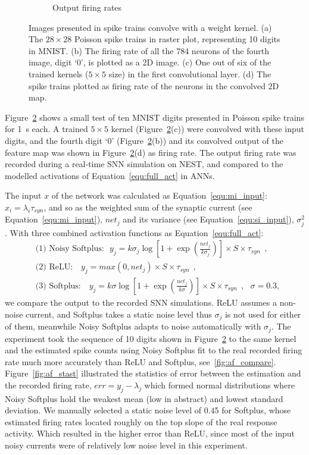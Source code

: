 \begin{figure}[tbh!]
\begin{subfigure}[t]{0.3\textwidth}
			\caption{Output firing rates}
			\label{Fig:64}
		\end{subfigure}
		\caption{Images presented in spike trains convolve with a weight kernel. (a) The $28\times28$ Poisson spike trains in raster plot, representing 10 digits in MNIST. (b) The firing rate of all the 784 neurons of the fourth image, digit `0', is plotted as a 2D image.
		(c) One out of six of the trained kernels ($5\times5$ size) in the first convolutional layer.
		(d) The spike trains plotted as firing rate of the neurons in the convolved 2D map.}
		\label{fig:cnn}
	\end{figure}

	Figure~\ref{fig:cnn} shows a small test of ten MNIST digits presented in Poisson spike trains for 1~s each.
	A trained $5\times5$ kernel (Figure~\ref{fig:cnn}(c)) were convolved with these input digits, and the fourth digit `0' (Figure~\ref{fig:cnn}(b)) and its convolved output of the feature map was shown in Figure~\ref{fig:cnn}(d) as firing rate.
	The output firing rate was recorded during a real-time SNN simulation on NEST, and compared to the modelled activations of Equation~\ref{equ:full_act} in ANNs.
	
	The input $x$ of the network was calculated as Equation~\ref{equ:mi_input}: $x_i=\lambda_i\tau_{syn}$, and so as the weighted sum of the synaptic current (see Equation~\ref{equ:mi_input}), $net_j$ and its variance (see Equation~\ref{equ:si_input}), $\sigma^2_j$.
	With three combined activation functions as Equation~\ref{equ:full_act}:
	\begin{equation}
	\begin{aligned}
	&\textrm{(1) Noisy Softplus:~~}  y_j=k \sigma_j \log [1 + \exp(\frac{net_j}{k \sigma_j})] \times S \times \tau_{syn}~~,  \\
	&\textrm{(2) ReLU:~~ } y_j=max(0, net_j) \times S \times \tau_{syn}~~, \\
	&\textrm{(3) Softplus:~~ } y_j=k \sigma \log [1 + \exp(\frac{net_j}{k \sigma})] \times S \times \tau_{syn}~~, ~~~\sigma=0.3,  
 	\end{aligned}
	\end{equation}	
	we compare the output to the recorded SNN simulations.
	ReLU assumes a non-noise current, and Softplus takes a static noise level thus $\sigma_j$ is not used for either of them, meanwhile Noisy Softplus adapts to noise automatically with $\sigma_j$.
	The experiment took the sequence of 10 digits shown in Figure~\ref{fig:cnn} to the same kernel and the estimated spike counts using Noisy Softplus fit to the real recorded firing rate much more accurately than ReLU and Softplus,  see~\ref{fig:af_compare}.
	Figure~\ref{fig:af_stast} illustrated the statistics of error between the estimation and the recorded firing rate, $err = y_j - \lambda_j$ which formed normal distributions where Noisy Softplus hold the weakest mean (low in abstract) and lowest standard deviation.
	We manually selected a static noise level of 0.45 for Softplus, whose estimated firing rates located roughly on the top slope of the real response activity.
	Which resulted in the higher error than ReLU, since most of the input noisy currents were of relatively low noise level in this experiment.
	
